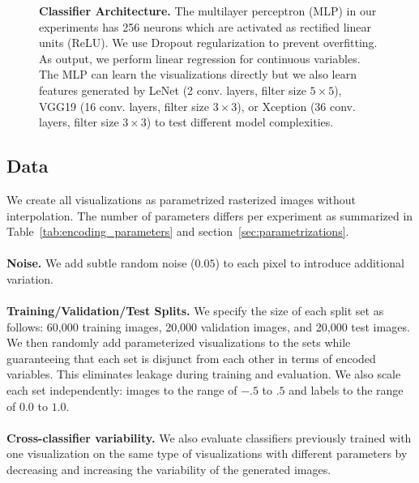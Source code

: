 \begin{figure}[t]
	\centering
	
	\hfill

  \caption{\textbf{Classifier Architecture.} The multilayer perceptron (MLP) in our experiments has 256 neurons which are activated as rectified linear units (ReLU). We use Dropout regularization to prevent overfitting. As output, we perform linear regression for continuous variables. The MLP can learn the visualizations directly but we also learn features generated by LeNet (2 conv. layers, filter size $5\times5$), VGG19 (16 conv. layers, filter size $3\times3$), or Xception (36 conv. layers, filter size $3\times3$) to test different model complexities. }
	\label{fig:classifiers}
\end{figure}

\subsection{Data}

We create all visualizations as parametrized rasterized images without interpolation. The number of parameters differs per experiment as summarized in Table~\ref{tab:encoding_parameters} and section~\ref{sec:parametrizations}. 
\\~\\
\noindent\textbf{Noise.} We add subtle random noise ($0.05$) to each pixel to introduce additional variation.
\\~\\
\noindent\textbf{Training/Validation/Test Splits.} We specify the size of each split set as follows: 60,000 training images, 20,000 validation images, and 20,000 test images. We then randomly add parameterized visualizations to the sets while guaranteeing that each set is disjunct from each other in terms of encoded variables. This eliminates leakage during training and evaluation. We also scale each set independently: images to the range of $-.5$ to $.5$ and labels to the range of $0.0$ to $1.0$. 
\\~\\
\noindent\textbf{Cross-classifier variability.} We also evaluate classifiers previously trained with one visualization on the same type of visualizations with different parameters by decreasing and increasing the variability of the generated images.

